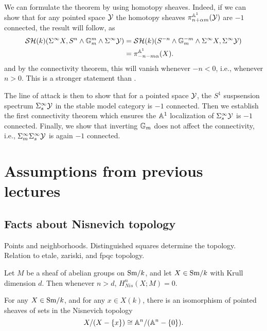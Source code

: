 \documentclass{amsart}%
\begin{document}
\begin{remark}
  We can formulate the theorem by using homotopy sheaves. Indeed, if
  we can show that for any pointed space $\mathcal{Y}$ the homotopy sheaves
  $\pi^{\mathbb{A}^1}_{n+\alpha m}(\mathcal{Y})$ are $-1$ connected,
  the result will follow, as 
  \begin{align*}
    \mathcal{SH}(k)(\Sigma^{\infty}X, S^n\wedge \mathbb{G}_m^m \wedge \Sigma^{\infty} \mathcal{Y}) 
    & = \mathcal{SH}(k)(S^{-n}\wedge \mathbb{G}_m^{-m} \wedge \Sigma^{\infty}X, \Sigma^{\infty} \mathcal{Y})\\
    & = \pi_{-n-m\alpha}^{\mathbb{A}^1}(X).
  \end{align*}
  and by the connectivity theorem, this will vanish whenever $-n < 0$,
  i.e., whenever $n > 0$. This is a stronger statement than
  \cite[theorem 4.14]{Voevodsky}. 

  The line of attack is then to show that for a pointed space $\mathcal{Y}$,
  the $S^1$ suspsension spectrum $\Sigma^{\infty}_s \mathcal{Y}$ in the
  stable model category is $-1$ connected. Then we establish the
  first connectivity theorem which ensures the $\mathbb{A}^1$ localization
  of $\Sigma^{\infty}_s\mathcal{Y}$ is $-1$ connected. Finally, we show that
  inverting $\mathbb{G}_m$ does not affect the connectivity, i.e.,
  $\Sigma^{\infty}_{m}\Sigma^{\infty}_s \mathcal{Y}$ is again $-1$ connected. 
\end{remark}

\section{Assumptions from previous lectures}

\subsection{Facts about Nisnevich topology}

Points and neighborhoods. Distinguished squares determine the
topology. Relation to etale, zariski, and fpqc topology. 

\begin{proposition}\cite[2.4.1]{Mor04}
  Let $M$ be a sheaf of abelian groups on $\mathrm{Sm}/k$, and let
  $X\in \mathrm{Sm}/k$ with Krull dimension $d$. Then whenever $n > d$,
  $H^n_{Nis}(X;M) = 0$.
\end{proposition}

\begin{proposition}\cite[2.4.1]{Mor04}
  For any $X \in \mathrm{Sm}/k$, and for any $x \in X(k)$, there is an
  isomorphism of pointed sheaves of sets in the Nisnevich topology
  \begin{equation*}
    X/(X-\{x\}) \cong \mathbb{A}^n / (\mathbb{A}^n - \{0\}).
  \end{equation*}
\end{proposition}
\end{document}
